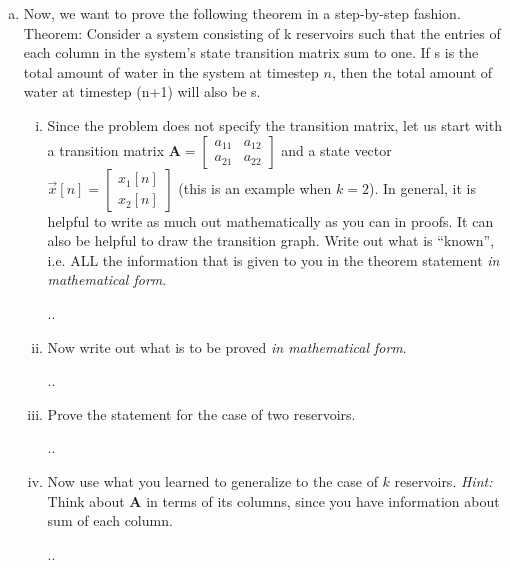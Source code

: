 \documentclass[11pt]{article}
\def\A{\textbf{A}} %
\begin{document}
\begin{enumerate}
\begin{enumerate}[(a)]
	      	\item Now, we want to prove the following theorem in a step-by-step fashion.\\Theorem: Consider a system consisting of k reservoirs such that the entries of each column in the system’s state transition matrix sum to one. If s is the total amount of water in the system at timestep $n$, then the total amount of water at timestep (n+1) will also be s.
	      	      \begin{enumerate}[i.]
	      	      	\item 
	      	      	      Since the problem does not specify the transition matrix, let us start with a transition matrix
	      	      	      $\A = \begin{bmatrix}
	      	      	      a_{11} & a_{12} \\
	      	      	      a_{21} & a_{22}
	      	      	\end{bmatrix}$ and a state vector $\vec x[n] = \begin{bmatrix}
	      	      	x_1[n]\\
	      	      	x_2[n]
	      	      	\end{bmatrix}$ (this is an example when $k = 2$). In general, it is helpful to write as much out mathematically as you can in proofs. It can also be helpful to draw the transition graph. Write out what is “known”, i.e. ALL the information that is given to you in the theorem statement \textit{in mathematical form}.
	      	      	\begin{Answer}
	      	      		..
	      	      	\end{Answer}
	      	      	\item Now write out what is to be proved \textit{in mathematical form}.
	      	      	      \begin{Answer}
	      	      	      	..
	      	      	      \end{Answer}
	      	      	\item Prove the statement for the case of two reservoirs.
	      	      	      \begin{Answer}
	      	      	      	..
	      	      	      \end{Answer}
	      	      	\item Now use what you learned to generalize to the case of $k$ reservoirs. \textit{Hint:} Think about $\A$ in terms of its columns, since you have information about sum of each column.
	      	      	      \begin{Answer}
	      	      	      	..
	      	      	      \end{Answer}
	      	      \end{enumerate}
	      	                  

\end{enumerate}
\end{enumerate}
\end{document}
